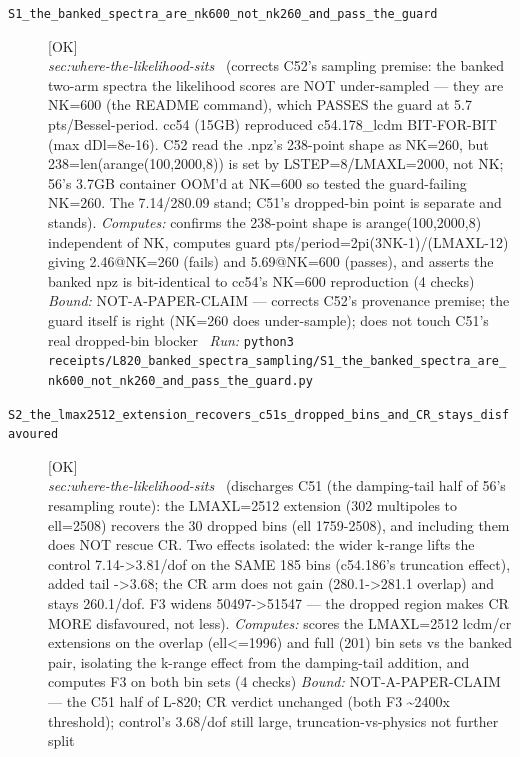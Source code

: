 \begin{description}
\item[\label{rcpt:S1_the_banked_spectra_are_nk600_not_nk260_and_pass_the_guard}\textbf{}\quad\texttt{S1\_the\_banked\_spectra\_are\_nk600\_not\_nk260\_and\_pass\_the\_guard}]\hfill\textsf{[OK]}\\
\textit{sec:where-the-likelihood-sits} \ (corrects C52's sampling premise: the banked two-arm spectra the likelihood scores are NOT under-sampled --- they are NK=600 (the README command), which PASSES the guard at 5.7 pts/Bessel-period. cc54 (15GB) reproduced c54.178\_lcdm BIT-FOR-BIT (max \textbar{}dDl\textbar{}=8e-16). C52 read the .npz's 238-point shape as NK=260, but 238=len(arange(100,2000,8)) is set by LSTEP=8/LMAXL=2000, not NK; 56's 3.7GB container OOM'd at NK=600 so tested the guard-failing NK=260. The 7.14/280.09 stand; C51's dropped-bin point is separate and stands). 
\emph{Computes:} confirms the 238-point shape is arange(100,2000,8) independent of NK, computes guard pts/period=2pi(3NK-1)/(LMAXL-12) giving 2.46@NK=260 (fails) and 5.69@NK=600 (passes), and asserts the banked npz is bit-identical to cc54's NK=600 reproduction (4 checks)
 \emph{Bound:} NOT-A-PAPER-CLAIM --- corrects C52's provenance premise; the guard itself is right (NK=260 does under-sample); does not touch C51's real dropped-bin blocker
\ \emph{Run:} \texttt{python3 receipts/L820\_banked\_spectra\_sampling/S1\_the\_banked\_spectra\_are\_nk600\_not\_nk260\_and\_pass\_the\_guard.py}
\item[\label{rcpt:S2_the_lmax2512_extension_recovers_c51s_dropped_bins_and_CR_stays_disfavoured}\textbf{}\quad\texttt{S2\_the\_lmax2512\_extension\_recovers\_c51s\_dropped\_bins\_and\_CR\_stays\_disfavoured}]\hfill\textsf{[OK]}\\
\textit{sec:where-the-likelihood-sits} \ (discharges C51 (the damping-tail half of 56's resampling route): the LMAXL=2512 extension (302 multipoles to ell=2508) recovers the 30 dropped bins (ell 1759-2508), and including them does NOT rescue CR. Two effects isolated: the wider k-range lifts the control 7.14->3.81/dof on the SAME 185 bins (c54.186's truncation effect), added tail ->3.68; the CR arm does not gain (280.1->281.1 overlap) and stays 260.1/dof. F3 widens 50497->51547 --- the dropped region makes CR MORE disfavoured, not less). 
\emph{Computes:} scores the LMAXL=2512 lcdm/cr extensions on the overlap (ell<=1996) and full (201) bin sets vs the banked pair, isolating the k-range effect from the damping-tail addition, and computes F3 on both bin sets (4 checks)
 \emph{Bound:} NOT-A-PAPER-CLAIM --- the C51 half of L-820; CR verdict unchanged (both F3 \textasciitilde{}2400x threshold); control's 3.68/dof still large, truncation-vs-physics not further split

\end{description}
